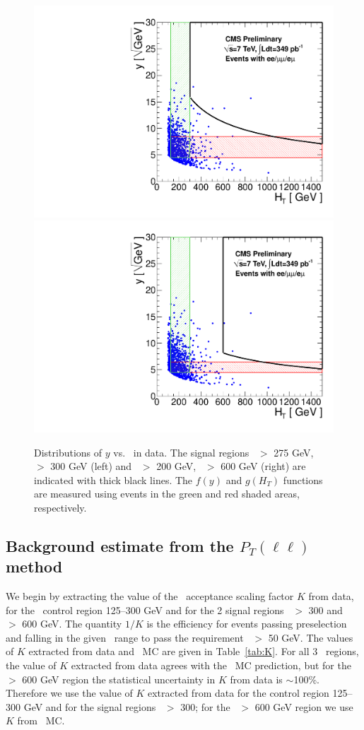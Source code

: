 \begin{figure}[hbt]
\begin{center}
\includegraphics[width=0.48\linewidth]{plots/abcdprime_349pb_highmet.pdf}
\includegraphics[width=0.48\linewidth]{plots/abcdprime_349pb_highht.pdf}
\caption{\label{fig:abcdprimedata}\protect 
Distributions of $y$ vs. \Ht\ in data. The signal regions \met\ $>$ 275 GeV, \Ht\ $>$ 300 GeV (left)
and \met\ $>$ 200 GeV, \Ht\ $>$ 600 GeV (right) are indicated with thick black lines. 
The $f(y)$ and $g(H_T)$ 
functions are measured using events in the green and red shaded areas, respectively.
}
\end{center}
\end{figure}

\subsection{Background estimate from the $P_T(\ell\ell)$ method}
\label{sec:victoryres}

We begin by extracting the value of the \met\ acceptance scaling factor $K$ from data,
for the \Ht\ control region 125--300 GeV and for the 2 signal regions \Ht\ $>$ 300 and
\Ht\ $>$ 600 GeV. The quantity $1/K$ is the efficiency for events passing preselection
and falling in the given \Ht\ range to pass the requirement \ptll\ $>$ 50 GeV.
The values of $K$ extracted from data and \ttbar\ MC are given in Table~\ref{tab:K}.
For all 3 \Ht\ regions, the value of $K$ extracted from data agrees with the 
\ttbar\ MC prediction, but for the \Ht\ $>$ 600 GeV region the statistical uncertainty
in $K$ from data is $\sim$100\%. Therefore we use the value of $K$ extracted from
data for the control region 125--300 GeV and for the signal regions \Ht\ $>$ 300;
for the \Ht\ $>$ 600 GeV region we use $K$ from \ttbar\ MC.


